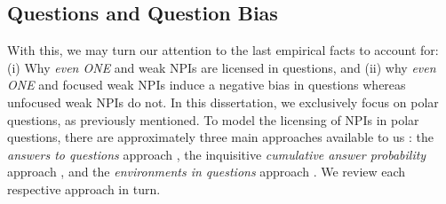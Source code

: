 \subsection{Questions and Question Bias}
With this, we may turn our attention to the last empirical facts to account for: (i) Why \textit{even \MakeUppercase{one}} and weak NPIs are licensed in questions, and (ii) why \textit{even \MakeUppercase{one}} and focused weak NPIs induce a negative bias in questions whereas unfocused weak NPIs do not. In this dissertation, we exclusively focus on polar questions, as previously mentioned. To model the licensing of NPIs in polar questions, there are approximately three main approaches available to us \parencite{Crnic2014-dogma,Crnic2014-nm,Jeong2021,Jeong2022}: the \textit{answers to questions} approach \parencite{Guerzoni2003,Guerzoni2004}, the inquisitive \textit{cumulative answer probability} approach \parencite{Jeong2021,Jeong2022}, and the \textit{environments in questions} approach \parencite{Guerzoni2014-enviro,Nicolae2013}. We review each respective approach in turn. 

